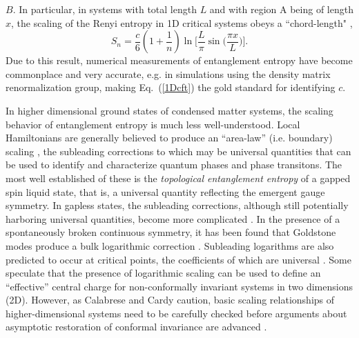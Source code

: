 \documentclass[prl,aps,twocolumn,floatfix,amsmath,amssymb,superscriptaddress,tightenlines]{revtex4}
\begin{document}
$B$.  In particular, in systems with total length $L$ and with region A being of length $x$, the scaling of the Renyi entropy in 1D critical systems obeys a ``chord-length" \cite{Korepin,Cardy},
%
\begin{equation}
S_n = \frac{c}{6}\left({1+ \frac{1}{n} }\right) \ln\Big[ \frac{L}{\pi} \sin\big( \frac{\pi x}{L} \big) \Big]. \label{1Dcft}
\end{equation}
Due to this result, numerical measurements of entanglement entropy have become commonplace and 
very accurate, e.g. in simulations using the density matrix renormalization group,
making Eq.~(\ref{1Dcft}) the gold standard for identifying $c$.


In higher dimensional ground states of condensed matter systems, the scaling behavior of
entanglement entropy is much less well-understood.  Local Hamiltonians
are generally believed to produce an ``area-law'' (i.e. boundary) scaling \cite{ALreview}, the subleading corrections
to which may be universal quantities that can be used to identify and characterize
quantum phases and phase transitons.
The most well established of these is the {\it topological entanglement entropy} \cite{Alioscia1,Alioscia2,KP,LW} of a gapped
spin liquid state, that is, a universal quantity reflecting the emergent gauge symmetry.
In gapless states, the subleading corrections, although still potentially harboring universal 
quantities, become more complicated \cite{Misguich}.
In the presence of a spontaneously broken continuous symmetry, it has been found that Goldstone modes 
produce a bulk logarithmic correction \cite{HeisLog,MaxLog}.
Subleading logarithms are also predicted to occur at critical points, the coefficients of which are universal \cite{logcorner,Max}.
Some speculate that the presence of logarithmic scaling can be used to define an ``effective'' central
charge for non-conformally invariant systems in two dimensions (2D). %
However, as Calabrese and Cardy caution, basic scaling relationships of
higher-dimensional systems need to be carefully checked before
arguments about asymptotic restoration of conformal invariance are
advanced \cite{EE_CFT}.
\end{document}

